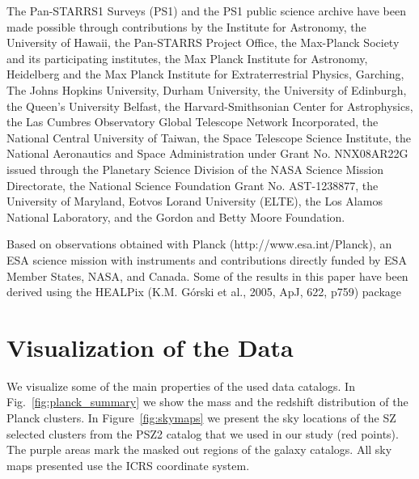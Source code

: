 \documentclass[iop, apjl, twocolappendix, numberedappendix]{emulateapj}
\begin{document}
The Pan-STARRS1 Surveys (PS1) and the PS1 public science archive
have been made possible through contributions by the Institute for
Astronomy, the University of Hawaii, the Pan-STARRS Project Office,
the Max-Planck Society and its participating institutes, the Max
Planck Institute for Astronomy, Heidelberg and the Max Planck
Institute for Extraterrestrial Physics, Garching, The Johns Hopkins
University, Durham University, the University of Edinburgh, the
Queen's University Belfast, the Harvard-Smithsonian Center for
Astrophysics, the Las Cumbres Observatory Global Telescope Network
Incorporated, the National Central University of Taiwan, the Space
Telescope Science Institute, the National Aeronautics and Space
Administration under Grant No. NNX08AR22G issued through the
Planetary Science Division of the NASA Science Mission Directorate,
the National Science Foundation Grant No. AST-1238877, the
University of Maryland, Eotvos Lorand University (ELTE), the Los
Alamos National Laboratory, and the Gordon and Betty Moore
Foundation.

Based on observations obtained with Planck
(http://www.esa.int/Planck), an ESA science mission with instruments
and contributions directly funded by ESA Member States, NASA, and
Canada.  Some of the results in this paper have been derived using
the HEALPix (K.M. Górski et al., 2005, ApJ, 622, p759) package




\appendix


\section{Visualization of the Data}
\label{sec:figures}

We visualize some of the main properties of the used data catalogs.
In Fig.~\ref{fig:planck_summary} we show the mass and
the redshift distribution of the Planck clusters.
In Figure~\ref{fig:skymaps} we present the sky locations of the SZ selected clusters from the PSZ2 catalog that we used in our study (red points). The purple areas mark the masked out regions of the galaxy catalogs. All sky maps presented use the ICRS coordinate system.
\end{document}
